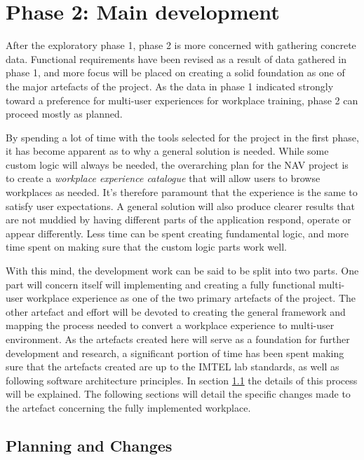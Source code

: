 
\chapter{Phase 2:  Main development}
\label{chap:phase2}

After the exploratory phase 1, phase 2 is more concerned with gathering concrete data. Functional requirements have been revised as a result of data gathered in phase 1, and more focus will be placed on creating a solid foundation as one of the major artefacts of the project. As the data in phase 1 indicated strongly toward a preference for multi-user experiences for workplace training, phase 2 can proceed mostly as planned.

By spending a lot of time with the tools selected for the project in the first phase, it has become apparent as to why a general solution is needed. While some custom logic will always be needed, the overarching plan for the NAV project is to create a \textit{workplace experience catalogue} that will allow users to browse workplaces as needed. It's therefore paramount that the experience is the same to satisfy user expectations. A general solution will also produce clearer results that are not muddied by having different parts of the application respond, operate or appear differently. Less time can be spent creating fundamental logic, and more time spent on making sure that the custom logic parts work well.

With this mind, the development work can be said to be split into two parts. One part will concern itself will implementing and creating a fully functional multi-user workplace experience as one of the two primary artefacts of the project. The other artefact and effort will be devoted to creating the general framework and mapping the process needed to convert a workplace experience to multi-user environment. As the artefacts created here will serve as a foundation for further development and research, a significant portion of time has been spent making sure that the artefacts created are up to the IMTEL lab standards, as well as following software architecture principles. In section \ref{} the details of this process will be explained. The following sections will detail the specific changes made to the artefact concerning the fully implemented workplace.


\section{Planning and Changes}



